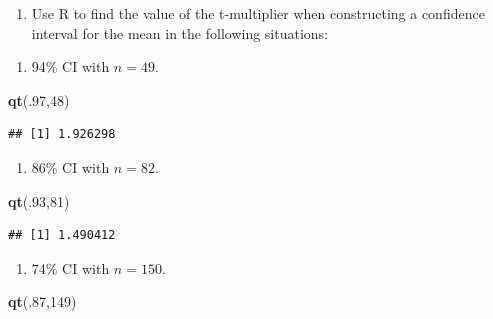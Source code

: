 \documentclass[
  openany]{book}
\newenvironment{Shaded}{\begin{snugshade}}{\end{snugshade}}
\newcommand{\DecValTok}[1]{\textcolor[rgb]{0.00,0.00,0.81}{#1}}
\newcommand{\FunctionTok}[1]{\textcolor[rgb]{0.13,0.29,0.53}{\textbf{#1}}}
\newcommand{\NormalTok}[1]{#1}
\providecommand{\tightlist}{%
  \setlength{\itemsep}{0pt}\setlength{\parskip}{0pt}}
\begin{document}
\begin{enumerate}
\def\labelenumi{\arabic{enumi}.}
\setcounter{enumi}{5}
\tightlist
\item
  Use R to find the value of the t-multiplier when constructing a confidence interval for the mean in the following situations:
\end{enumerate}

\begin{enumerate}
\def\labelenumi{(\alph{enumi})}
\tightlist
\item
  94\% CI with \(n=49\).
\end{enumerate}

\begin{Shaded}
\begin{Highlighting}[]
\FunctionTok{qt}\NormalTok{(.}\DecValTok{97}\NormalTok{,}\DecValTok{48}\NormalTok{)}
\end{Highlighting}
\end{Shaded}

\begin{verbatim}
## [1] 1.926298
\end{verbatim}

\begin{enumerate}
\def\labelenumi{(\alph{enumi})}
\setcounter{enumi}{1}
\tightlist
\item
  86\% CI with \(n=82\).
\end{enumerate}

\begin{Shaded}
\begin{Highlighting}[]
\FunctionTok{qt}\NormalTok{(.}\DecValTok{93}\NormalTok{,}\DecValTok{81}\NormalTok{)}
\end{Highlighting}
\end{Shaded}

\begin{verbatim}
## [1] 1.490412
\end{verbatim}

\begin{enumerate}
\def\labelenumi{(\alph{enumi})}
\tightlist
\item
  74\% CI with \(n=150\).
\end{enumerate}

\begin{Shaded}
\begin{Highlighting}[]
\FunctionTok{qt}\NormalTok{(.}\DecValTok{87}\NormalTok{,}\DecValTok{149}\NormalTok{)}
\end{Highlighting}
\end{Shaded}
\end{document}
